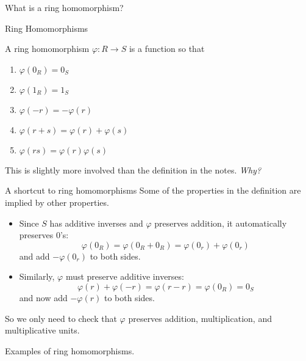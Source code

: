 \documentclass{beamer}
\begin{document}
\begin{frame}[plain,c]

\begin{center}

\Huge

What is a ring homomorphism?
\end{center}

\end{frame}
\begin{frame}{Ring Homomorphisms}
  \begin{definition}
    A ring homomorphism $\varphi:R\to S$ is a function so that
    \begin{enumerate}
    \item $\varphi(0_R)=0_S$
    \item $\varphi(1_R)=1_S$
     \item $\varphi(-r)=-\varphi(r)$
     \item $\varphi(r+s)=\varphi(r)+ \varphi(s)$
       \item $\varphi(rs)=\varphi(r)\varphi(s)$
      \end{enumerate}
\end{definition}  
This is slightly more involved than the definition in the notes.  \emph{Why?}
\end{frame}

\begin{frame}{A shortcut to ring homomorphisms}
  Some of the properties in the definition are implied by other properties.
  \begin{itemize}
  \item Since $S$ has additive inverses and $\varphi$ preserves addition, it automatically preserves $0$'s:
    $$\varphi(0_R)=\varphi(0_R+0_R)=\varphi(0_r)+\varphi(0_r)$$
    and add $-\varphi(0_r)$ to both sides.
  \item Similarly, $\varphi$ must preserve additive inverses:
    $$\varphi(r)+\varphi(-r)=\varphi(r-r)=\varphi(0_R)=0_S$$
    and now add $-\varphi(r)$ to both sides.
  \end{itemize}

So we only need to check that $\varphi$ preserves addition, multiplication, and multiplicative units.
  \end{frame}


\begin{frame}[plain,c]

\begin{center}

\Huge

Examples of ring homomorphisms.
\end{center}

\end{frame}
\end{document}
